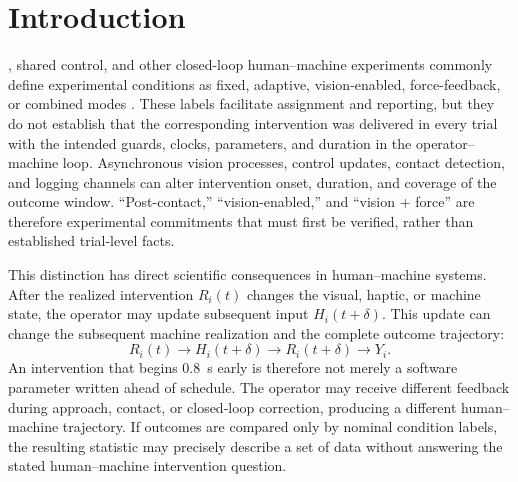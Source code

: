 \documentclass[journal]{IEEEtran}
\begin{document}
\section{Introduction}

, shared control, and other closed-loop
human--machine experiments commonly define experimental conditions as fixed,
adaptive, vision-enabled, force-feedback, or combined modes
\cite{hannaford1989,lawrence1993,hokayem2006,passenberg2010,huang2019,rakita2020,louca2024,gong2024,hogan1985,walker2010,buchli2011,ajoudani2012,peternel2018,abudakka2018,abudakka2020,michel2021,peternel2023,michel2023,huang2021,siegemund2024}.
These labels facilitate assignment and reporting, but they do not establish
that the corresponding intervention was delivered in every trial with the
intended guards, clocks, parameters, and duration in the operator--machine
loop. Asynchronous vision processes, control updates, contact detection, and
logging channels can alter intervention onset, duration, and coverage of the
outcome window. ``Post-contact,'' ``vision-enabled,'' and ``vision + force''
are therefore experimental commitments that must first be verified, rather
than established trial-level facts.

\nocite{jekel2026}

This distinction has direct scientific consequences in human--machine
systems. After the realized intervention $R_i(t)$ changes the visual, haptic,
or machine state, the operator may update subsequent input $H_i(t+\delta)$.
This update can change the subsequent machine realization and the complete
outcome trajectory:
\begin{equation}
R_i(t)\rightarrow H_i(t+\delta)\rightarrow R_i(t+\delta)\rightarrow Y_i.
\label{eq:closed_loop}
\end{equation}
An intervention that begins 0.8~s early is therefore not merely a software
parameter written ahead of schedule. The operator may receive different
feedback during approach, contact, or closed-loop correction, producing a
different human--machine trajectory. If outcomes are compared only by nominal
condition labels, the resulting statistic may precisely describe a set of
data without answering the stated human--machine intervention question.
\end{document}
